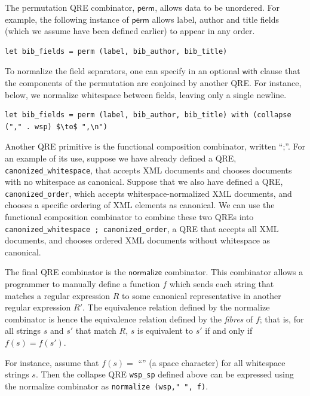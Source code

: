 \documentclass[acmsmall,review,anonymous]{acmart}
\newcommand{\kw}[1]{\textcolor{dkred}{\ensuremath{\mathsf{#1}}}}
\begin{document}
The permutation QRE combinator, \kw{perm}, allows data to be unordered. For example,
the following instance of \kw{perm} allows label, author and title fields
(which we assume have been defined earlier) to appear in any order.
%
\begin{lstlisting}
let bib_fields = perm (label, bib_author, bib_title)
\end{lstlisting}
%
To normalize the field separators, one can specify 
in an optional \kw{with} clause that the components of the
permutation are conjoined by another QRE. For instance, below, we normalize
whitespace between fields, leaving only a single newline.
%
\begin{lstlisting}
let bib_fields = perm (label, bib_author, bib_title) with (collapse ("," . wsp) $\to$ ",\n")
\end{lstlisting}

Another QRE primitive is the functional composition combinator, written ``;''.
For an example of its use, suppose we have already defined a QRE,
\lstinline{canonized_whitespace}, that accepts XML documents and chooses
documents with no whitespace as canonical. Suppose that we also have defined a
QRE, \lstinline{canonized_order}, which accepts whitespace-normalized XML
documents, and chooses a specific ordering of XML elements as canonical. We can
use the functional composition combinator to combine these two QREs into
\lstinline{canonized_whitespace ; canonized_order}, a QRE that accepts all XML
documents, and chooses ordered XML documents without whitespace as canonical.

The final QRE combinator is the \kw{normalize} combinator. This combinator
allows a programmer to manually define a function $f$ which sends each
string that matches a regular expression $R$ to some canonical
representative in another regular expression $R'$. The equivalence
relation defined by the normalize combinator is hence the equivalence
relation defined by the {\em fibres} of $f$; that is, for all strings
$s$ and $s'$ that match $R$, $s$ is equivalent to $s'$ if and only if
$f(s) = f(s')$.

For instance, assume that $f(s)=$ ``\textvisiblespace'' (a space
character) for all whitespace strings $s$. Then the 
collapse QRE \lstinline{wsp_sp} defined above can
be expressed using the normalize combinator as
\lstinline{normalize (wsp," ", f)}.
\end{document}
